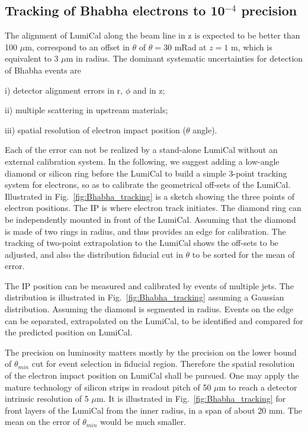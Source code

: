 

\subsection{Tracking of Bhabha electrons to 10$^{-4}$ precision}   %
\label{sec:BhabhaTrcking} %

The alignment of LumiCal along the beam line in z is expected
to be better than 100 $\mu$m, correspond to an offset in $\theta$ of 
$\theta=30$ mRad at $z=1$ m, which is equivalent to 3 $\mu$m in radius.
The dominant systematic uncertainties for detection of Bhabha events are  
\begin{list}{}{\setlength{\leftmargin}{18pt}
		\setlength{\labelsep}{10pt}
		\setlength{\itemsep}{5pt}
		\setlength{\parsep}{0pt}}
	\item{i)}
	detector alignment errors in r, $\phi$ and in z;
	\item{ii)}
	multiple scattering in upstream materials;
	\item{iii)} 
	spatial resolution of electron impact position ($\theta$ angle).
\end{list}
Each of the error can not be realized by a stand-alone LumiCal
without an external calibration system. 
In the following, we suggest adding a low-angle diamond or silicon ring
before the LumiCal to build a simple 3-point tracking system for electrons,
so as to calibrate the geometrical off-sets of the LumiCal.
Illustrated in Fig.~\ref{fig:Bhabha_tracking} is a sketch showing
the three points of electron positions.
The IP is where electron track initiates.
The diamond ring can be independently mounted in front of the LumiCal.
Assuming that the diamond is made of two rings in radius, and
thus provides an edge for calibration.
The tracking of two-point extrapolation to the LumiCal shows the off-sets 
to be adjusted, and also the distribution fiducial cut in $\theta$
to be sorted for the mean of error.

The IP position can be measured and calibrated by events of multiple jets.
The distribution is illustrated in Fig.~\ref{fig:Bhabha_tracking} assuming
a Gaussian distribution. Assuming the diamond is segmented in radius.
Events on the edge can be separated, extrapolated on the LumiCal, to be
identified and compared for the predicted position on LumiCal.

The precision on luminosity matters mostly by the precision on 
the lower bound of $\theta_{min}$ cut for event selection in fiducial region.
Therefore the spatial resolution of the electron impact position on LumiCal
shall be pursued. One may apply the mature technology of silicon strips
in readout pitch of 50 $\mu$m to reach a detector intrinsic resolution of
5 $\mu$m. It is illustrated in Fig.~\ref{fig:Bhabha_tracking} for front layers
of the LumiCal from the inner radius, in a span of about 20 mm. 
The mean on the error of $\theta_{min}$ would be much smaller.




